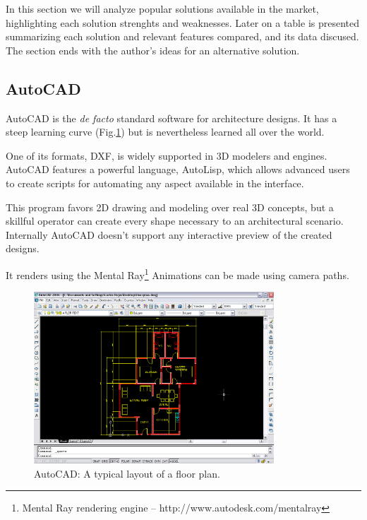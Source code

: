 
In this section we will analyze popular solutions available in the market,
highlighting each solution strenghts and weaknesses.
Later on a table is presented summarizing each solution and relevant features compared, and its
data discused.
The section ends with the author's ideas for an alternative solution.

\subsection{AutoCAD}
AutoCAD is the \emph{de facto} standard software for architecture designs.
It has a steep learning curve (Fig.\ref{FIG-AUTOCAD}) but is nevertheless
learned all over the world.

One of its formats, DXF, is widely supported in 3D modelers and engines.
AutoCAD features a powerful language, AutoLisp, which allows advanced users to create scripts for
automating any aspect available in the interface.

This program favors 2D drawing and modeling over real 3D concepts,
but a skillful operator can create every shape necessary to an architectural scenario.
Internally AutoCAD doesn't support any interactive preview of the created designs.

It renders using the Mental Ray\footnote{Mental Ray rendering engine -- http://www.autodesk.com/mentalray}%
Animations can be made using camera paths.

\begin{figure}[!ht]
    \centering
    \includegraphics[width=9cm]{gfx/autocad-1.png}
    \caption{AutoCAD: A typical layout of a floor plan.}
    \label{FIG-AUTOCAD}
\end{figure}


